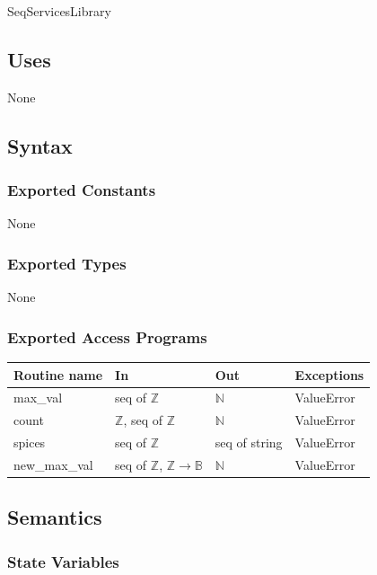 \documentclass[12pt,fleqn]{examtst}
\begin{document}
SeqServicesLibrary

\subsection* {Uses}

None

\subsection* {Syntax}

\subsubsection* {Exported Constants}

None

\subsubsection* {Exported Types}

None 

\subsubsection* {Exported Access Programs}

\begin{tabular}{| l | l | l | p{5cm} |}
\hline
\textbf{Routine name} & \textbf{In} & \textbf{Out} & \textbf{Exceptions}\\
\hline
max\_val & seq of $\mathbb{Z}$ & $\mathbb{N}$ & ValueError\\
  \hline
count & $\mathbb{Z}$, seq of $\mathbb{Z}$ & $\mathbb{N}$ & ValueError\\
\hline
spices & seq of $\mathbb{Z}$ & seq of string & ValueError\\
\hline
new\_max\_val & seq of $\mathbb{Z}$, $\mathbb{Z} \rightarrow \mathbb{B}$ &
                                                                           $\mathbb{N}$ & ValueError\\
\hline
  
\end{tabular}

\subsection* {Semantics}

\subsubsection* {State Variables}
\end{document}

